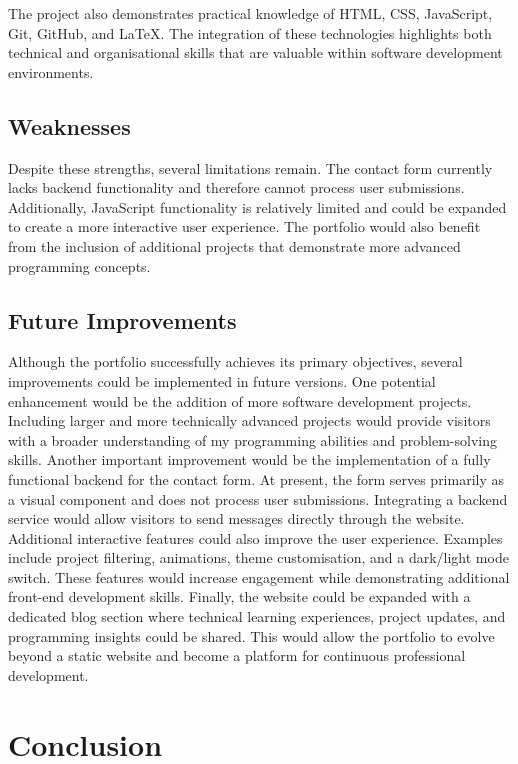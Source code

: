 \documentclass[12pt,a4paper]{article}
\begin{document}
The project also demonstrates practical knowledge of HTML, CSS, JavaScript, 
Git, GitHub, and LaTeX. The integration of these technologies highlights 
both technical and organisational skills that are valuable within software 
development environments.

\subsection{Weaknesses}

Despite these strengths, several limitations remain. The contact form 
currently lacks backend functionality and therefore cannot process user 
submissions. Additionally, JavaScript functionality is relatively limited 
and could be expanded to create a more interactive user experience. The 
portfolio would also benefit from the inclusion of additional projects that 
demonstrate more advanced programming concepts.

\subsection{Future Improvements}

Although the portfolio successfully achieves its primary objectives, 
several improvements could be implemented in future versions. One potential 
enhancement would be the addition of more software development projects. 
Including larger and more technically advanced projects would provide visitors
with a broader understanding of my programming abilities and problem-solving skills.
Another important improvement would be the implementation of a fully functional
backend for the contact form. At present, the form serves primarily as a visual
component and does not process user submissions. Integrating a backend service would 
allow visitors to send messages directly through the website.
Additional interactive features could also improve the user experience. 
Examples include project filtering, animations, theme customisation, 
and a dark/light mode switch. These features would increase engagement while 
demonstrating additional front-end development skills.
Finally, the website could be expanded with a dedicated blog section where 
technical learning experiences, project updates, and programming insights could be shared.
This would allow the portfolio to evolve beyond a static website and become a platform 
for continuous professional development.


\section{Conclusion}
\end{document}
